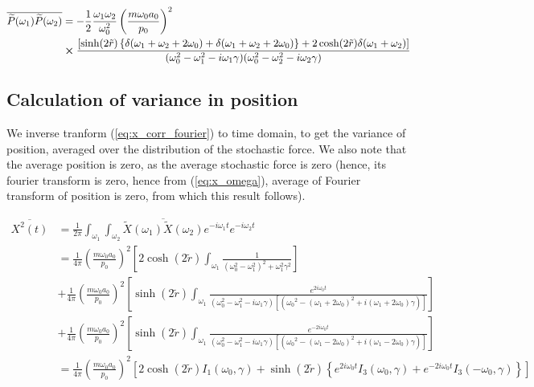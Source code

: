 \documentclass[12pt, twoside]{article}
\begin{document}
\begin{equation}\begin{aligned}
\overline{\widetilde { P } ( \omega_1 )\widetilde { P } ( \omega_2 )} & = -\frac{1}{2}\frac{\omega_1 \omega_2}{\omega_{ 0 } ^2} \left(\frac { m \omega_0 a_0 } { p _ { 0 } }\right)^2 \\&\cross \frac{\left[\sinh(2\tilde{r})\left\{\delta(\omega_1 + \omega_2 + 2\omega_0)+\delta(\omega_1 + \omega_2 + 2\omega_0)\right\} + 2\cosh(2\tilde{r})\delta(\omega_1 + \omega_2)\right]}{( \omega _ { 0 } ^ { 2 } - \omega_1 ^ { 2 } - i \omega_1 \gamma)(\omega _ { 0 } ^ { 2 } - \omega_2 ^ { 2 } - i \omega_2 \gamma)}\end{aligned}
\end{equation}
\subsection{Calculation of variance in position}

We inverse tranform (\ref{eq:x_corr_fourier}) to time domain, to get the variance of position, averaged over the distribution of the stochastic force. We also note that the average position is zero, as the average stochastic force is zero (hence, its fourier transform is zero, hence from (\ref{eq:x_omega}), average of Fourier transform of position is zero, from which this result follows).

$\begin{aligned} \overline{X ^ { 2 } ( t )} &= \frac { 1 } { 2 \pi } \int _ { \omega _ { 1 }}\int_{\omega_2} \overline{\widetilde { X } ( \omega_1 )\widetilde { X } ( \omega_2 )}  e ^ { - i \omega _ { 1 } t } e ^ { - i \omega _ { 2 } t } \\ &= \frac{1}{4\pi}\left(\frac { m \omega _ { 0 } a_0 } { p _ { 0 } }\right)^2 \left[ 2 \cosh(2\tilde{r}) \int_{\omega_1} \frac{1}{(\omega_0^2 - \omega_1 ^2)^2 + \omega_1 ^2 \gamma^2}\right] \\&+ \frac{1}{4\pi}\left(\frac { m \omega _ { 0 } a_0 } { p _ { 0 } }\right)^2 \left[ \sinh(2\tilde{r}) \int_{\omega_1} \frac{e^{2i\omega_0 t}}{(\omega_0^2 - \omega_1 ^2 - i\omega_1\gamma) [({\omega_0}^2 - (\omega_1 + 2\omega_0)^2 + i(\omega_1 + 2 \omega_0) \gamma)]}\right]
\\&+ \frac{1}{4\pi}\left(\frac { m \omega _ { 0 } a_0 } { p _ { 0 } }\right)^2 \left[ \sinh(2\tilde{r}) \int_{\omega_1} \frac{e^{-2i\omega_0 t}}{(\omega_0^2 - \omega_1 ^2 - i\omega_1\gamma) [({\omega_0}^2 - (\omega_1 - 2\omega_0)^2 + i(\omega_1 - 2 \omega_0) \gamma)]}\right] \\ & = \frac{1}{4\pi}\left(\frac { m \omega _ { 0 } a_0 } { p _ { 0 } }\right)^2 \left[ 2 \cosh(2\tilde{r}) I_1(\omega_0,\gamma) + \sinh(2\tilde{r}) \left\{e^{2i\omega_0 t}I_3(\omega_0,\gamma) + e^{-2i\omega_0 t}I_3(-\omega_0,\gamma)\right\}\right]
\end{aligned}$
\end{document}
